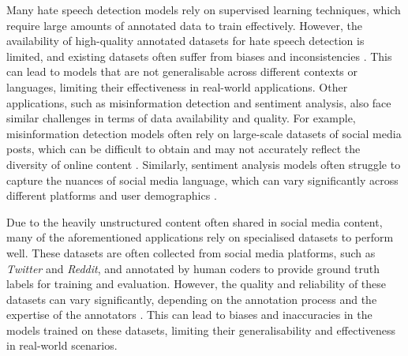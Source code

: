 
Many hate speech detection models rely on supervised learning techniques, which require large amounts of annotated data to train effectively. However, the availability of high-quality annotated datasets for hate speech detection is limited, and existing datasets often suffer from biases and inconsistencies \cite{davidson2017automated}. This can lead to models that are not generalisable across different contexts or languages, limiting their effectiveness in real-world applications. Other applications, such as misinformation detection and sentiment analysis, also face similar challenges in terms of data availability and quality. For example, misinformation detection models often rely on large-scale datasets of social media posts, which can be difficult to obtain and may not accurately reflect the diversity of online content \cite{shu2017fake}. Similarly, sentiment analysis models often struggle to capture the nuances of social media language, which can vary significantly across different platforms and user demographics \cite{barbieri2021xlm}.

Due to the heavily unstructured content often shared in social media content, many of the aforementioned applications rely on specialised datasets to perform well. These datasets are often collected from social media platforms, such as \textit{Twitter} and \textit{Reddit}, and annotated by human coders to provide ground truth labels for training and evaluation. However, the quality and reliability of these datasets can vary significantly, depending on the annotation process and the expertise of the annotators \cite{klie2024analyzing}. This can lead to biases and inaccuracies in the models trained on these datasets, limiting their generalisability and effectiveness in real-world scenarios. 

